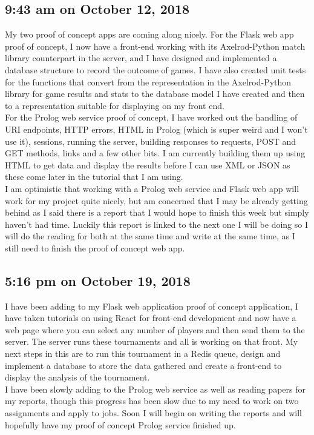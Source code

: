 \documentclass[]{final_report}
\begin{document}
\subsection*{9:43 am on October 12, 2018}
My two proof of concept apps are coming along nicely. For the Flask web app proof of concept, I now have a front-end working with its Axelrod-Python match library counterpart in the server, and I have designed and implemented a database structure to record the outcome of games. I have also created unit tests for the functions that convert from the representation in the Axelrod-Python library for game results and stats to the database model I have created and then to a representation suitable for displaying on my front end.\\
For the Prolog web service proof of concept, I have worked out the handling of URI endpoints, HTTP errors, HTML in Prolog (which is super weird and I won’t use it), sessions, running the server, building responses to requests, POST and GET methods, links and a few other bits. I am currently building them up using HTML to get data and display the results before I can use XML or JSON as these come later in the tutorial that I am using.\\
I am optimistic that working with a Prolog web service and Flask web app will work for my project quite nicely, but am concerned that I may be already getting behind as I said there is a report that I would hope to finish this week but simply haven’t had time. Luckily this report is linked to the next one I will be doing so I will do the reading for both at the same time and write at the same time, as I still need to finish the proof of concept web app. 

\subsection*{5:16 pm on October 19, 2018}
I have been adding to my Flask web application proof of concept application, I have taken tutorials on using React for front-end development and now have a web page where you can select any number of players and then send them to the server. The server runs these tournaments and all is working on that front. My next steps in this are to run this tournament in a Redis queue, design and implement a database to store the data gathered and create a front-end to display the analysis of the tournament.\\
I have been slowly adding to the Prolog web service as well as reading papers for my reports, though this progress has been slow due to my need to work on two assignments and apply to jobs. Soon I will begin on writing the reports and will hopefully have my proof of concept Prolog service finished up. 
\end{document}

